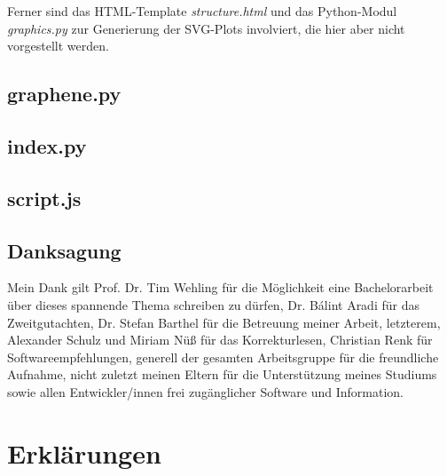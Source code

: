 \documentclass[a4paper, 10pt, twoside, openany]{book} %
\begin{document}
	Ferner sind das HTML-Template \emph{structure.html} und das Python-Modul \emph{graphics.py} zur Generierung der SVG-Plots involviert, die hier aber nicht vorgestellt werden.
	
	\section{graphene.py}
	
	
	
	\section{index.py}
	
	
	
	\section{script.js}
	
	
	
	\backmatter
	
	\vspace*{2cm}
	
	\begin{center}
		\begin{minipage}{0.67\textwidth}
			\chapter{Danksagung}
	
			Mein Dank gilt Prof. Dr. Tim Wehling für die Möglichkeit eine Bachelorarbeit über dieses spannende Thema schreiben zu dürfen, Dr. Bálint Aradi für das Zweitgutachten, Dr. Stefan Barthel für die Betreuung meiner Arbeit, letzterem, Alexander Schulz und Miriam Nüß für das Korrekturlesen, Christian Renk für Softwareempfehlungen, generell der gesamten Arbeitsgruppe für die freundliche Aufnahme, nicht zuletzt meinen Eltern für die Unterstützung meines Studiums sowie allen Entwickler/innen frei zugänglicher Software und Information.
		\end{minipage}
	\end{center}
	
	\chapter{Erklärungen}
	
\end{document}
